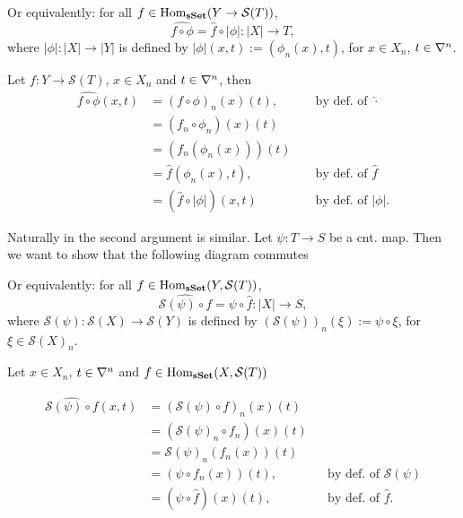 \documentclass[a4paper,11pt,english]{article}
\renewcommand{\S}[1]{\mathcal{S}(#1)}
\begin{document}
\begin{exercise}[1]
\begin{enumerate}
\begin{center}
\end{center}

Or equivalently: for all $f \in \Hom_{\sSet}(Y \to \S T)$, 
\[ \hat{f \circ \phi} = \hat f \circ |\phi| : |X| \to T, \]
where $|\phi|: |X|\to|Y|$ is
defined by $|\phi|(x,t) := (\phi_n(x), t)$, for $x \in X_n$, $t \in \nabla^n$.

Let $f: Y \to \S T$, $x \in X_n$ and $t \in \nabla^n$, then 
\begin{align*}
\hat{f \circ \phi} (x,t) &= (f \circ \phi)_n(x)(t), 
&& \text{ by def. of } \: \hat{\cdot} \\
&= (f_n \circ \phi_n)(x)(t) \\
&= (f_n(\phi_n(x)))(t) \\
&= \hat f(\phi_n(x), t), 
&& \text{ by def. of } \hat{f} \\
&= (\hat f \circ |\phi|)(x, t) 
&& \text{ by def. of } |\phi|. 
\end{align*}

Naturally in the second argument is similar. Let $\psi: T \to S$ be a cnt.
map. Then we want to show that the following diagram commutes

\begin{center}
\end{center}

Or equivalently: for all $f\in \Hom_{\sSet}(Y, \S T)$, 
\[ \hat{{\S\psi \circ f }} = \psi \circ \hat f : |X| \to S, \]
where $\S\psi: \S X \to \S Y$ is 
defined by $(\S\psi)_n(\xi) := \psi \circ \xi$, for $\xi \in \S X_n$.

Let $x \in X_n$, $t \in \nabla^n$ and $f \in \Hom_{\sSet}(X, \S T)$

\begin{align*}
\hat{\S\psi \circ f}(x,t) &= (\S\psi \circ f)_n(x)(t) \\
&= (\S\psi_n \circ f_n)(x)(t) \\
&= \S\psi_n(f_n(x))(t) \\
&= (\psi \circ f_n(x))(t), 
&& \text{by def. of } \S\psi \\
&= (\psi \circ \hat f)(x)(t), 
&& \text{by def. of } \hat f.
\end{align*}

\end{enumerate}
\end{exercise}
\end{document}
